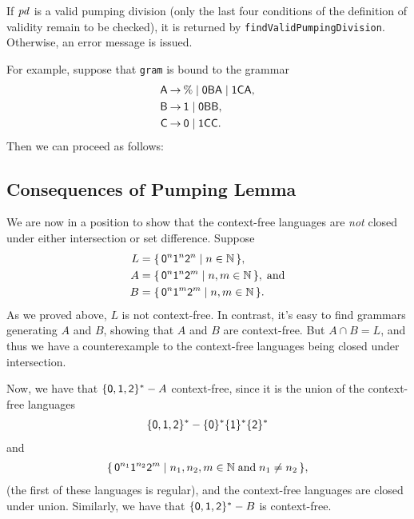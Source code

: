If ${\it pd}$ is a valid pumping division (only the last four conditions of
the definition of validity remain to be checked), it is returned by
\texttt{findValidPumpingDivision}. Otherwise, an error message is
issued.

For example, suppose that \texttt{gram} is bound to the
grammar
\begin{align*}
\mathsf{A} &\mathbin{\to} \% \mid \mathsf{0}\mathsf{B}\mathsf{A} \mid \mathsf{1}\mathsf{C}\mathsf{A} , \\
\mathsf{B} &\mathbin{\to} \mathsf{1} \mid \mathsf{0}\mathsf{B}\mathsf{B} , \\
\mathsf{C} &\mathbin{\to} \mathsf{0} \mid \mathsf{1}\mathsf{C}\mathsf{C} .
\end{align*}
Then we can proceed as follows:


\subsection{Consequences of Pumping Lemma}

%
%
We are now in a position to show that the context-free languages are
\emph{not} closed under either intersection or set difference.
Suppose
\begin{align*}
  L &= \{ \, \mathsf{0}^n\mathsf{1}^n\mathsf{2}^n \mid n\in\mathbb{N} \, \} , \\
  A &= \{ \, \mathsf{0}^n\mathsf{1}^n\mathsf{2}^m \mid n,m\in\mathbb{N} \, \} , \;\allowbreak\mbox{and}\allowbreak \\
  B &= \{ \, \mathsf{0}^n\mathsf{1}^m\mathsf{2}^m \mid n,m\in\mathbb{N} \, \} .
\end{align*}
As we proved above, $L$ is not context-free.  In contrast, it's easy
to find grammars generating $A$ and $B$, showing that $A$ and $B$ are
context-free.  But $A\cap B=L$, and thus we have a counterexample to
the context-free languages being closed under intersection.

Now, we have that
$\{\mathsf{0},\mathsf{1},\mathsf{2}\}^*-A$ context-free, since it is the
union of the context-free languages
\begin{gather*}
\{\mathsf{0},\mathsf{1},\mathsf{2}\}^*-\{\mathsf{0}\}^*\{\mathsf{1}\}^*\{\mathsf{2}\}^*
\end{gather*}
and
\begin{gather*}
\{ \, \mathsf{0}^{n_1}\mathsf{1}^{n_2}\mathsf{2}^m \mid n_1,n_2,m\in\mathbb{N}
\;\allowbreak\mbox{and}\allowbreak\;n_1\neq n_2 \, \} ,
\end{gather*}
(the first of these languages is regular), and the context-free languages
are closed under union.
Similarly, we have that $\{\mathsf{0},\mathsf{1},\mathsf{2}\}^*-B$ is
context-free.

